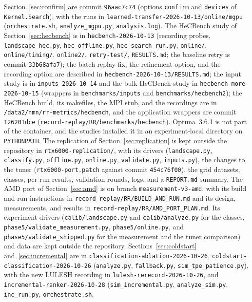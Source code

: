 \documentclass[10pt]{article}
\newcommand{\code}[1]{\texttt{#1}}
\begin{document}
Section~\ref{sec:confirm} are commit \code{96aac7c74} (options \code{confirm}
and \code{devices} of \code{Kernel.Search}), with the runs in
\code{learned-transfer-2026-10-13/online/mgpu} (\code{orchestrate.sh},
\code{analyze\_mgpu.py}, \code{analysis.log}). The HeCBench study of
Section~\ref{sec:hecbench} is in \code{hecbench-2026-10-13} (recording probes,
\code{landscape\_hec.py}, \code{hec\_offline.py}, \code{hec\_search\_run.py},
\code{online/}, \code{online/timing/}, \code{online2/}, \code{retry-test/},
\code{RESULTS.md}; the baseline retry is commit \code{33b68afa7}); the batch-replay
fix, the refinement option, and the recording option are described in
\code{hecbench-2026-10-13/RESULTS.md}; the input study is in
\code{inputs-2026-10-14} and the bulk HeCBench study in
\code{hecbench-more-2026-10-15} (wrappers in \code{benchmarks/inputs} and
\code{benchmarks/hecbench2}); the HeCBench build, its makefiles, the MPI
stub, and the recordings are in \code{/data2/nmn/rr-metrics/hecbench}, and the
application wrappers are commit \code{126201dce}
(\code{record-replay/RR/benchmarks/hecbench}).
Optuna~3.6.1 is not part of the container, and the studies installed it in an
experiment-local directory on \code{PYTHONPATH}. The replication of
Section~\ref{sec:replication} is kept outside the repository in
\code{rtx6000-replication/}, with its drivers (\code{landscape.py},
\code{classify.py}, \code{offline.py}, \code{online.py}, \code{validate.py},
\code{inputs.py}), the changes to the tuner (\code{rtx6000-port.patch} against
commit \code{454c76f00}), the grid datasets, classes, per-run results,
validation rounds, logs, and a \code{REPORT.md} summary. The AMD port of
Section~\ref{sec:amd} is on branch \code{measurement-v3-amd}, with its build
and run instructions in \code{record-replay/RR/BUILD\_AND\_RUN.md} and its
design, measurements, and results in \code{record-replay/RR/AMD\_PORT\_PLAN.md}.
Its experiment drivers (\code{calib/landscape.py} and \code{calib/analyze.py}
for the classes, \code{phase5/validate\_measurement.py},
\code{phase5/online.py}, and \code{phase5/validate\_shipped.py} for the
measurement and the tuner comparison) and data are kept outside the
repository. Sections~\ref{sec:coldstart} and~\ref{sec:incremental} are in
\code{classification-ablation-2026-10-26}, \code{coldstart-classification-2026-10-26}
(\code{analyze.py}, \code{fallback.py}, \code{sim\_tpe\_patience.py}), with the
new LULESH recording in \code{lulesh-rerecord-2026-10-26}, and
\code{incremental-ranker-2026-10-28} (\code{sim\_incremental.py},
\code{analyze\_sim.py}, \code{inc\_run.py}, \code{orchestrate.sh},
\end{document}
